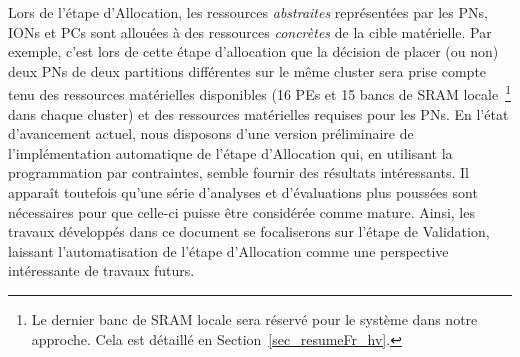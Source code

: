 \documentclass[main.tex]{subfiles}
\begin{document}
Lors de l'étape d'Allocation, les ressources \emph{abstraites} représentées par les PNs, IONs et PCs sont allouées à des ressources \emph{concrètes} de la cible matérielle. Par exemple, c'est lors de cette étape d'allocation que la décision de placer (ou non) deux PNs de deux partitions différentes sur le même cluster sera prise compte tenu des ressources matérielles disponibles (16 PEs et 15 bancs de SRAM locale~\footnote{Le dernier banc de SRAM locale sera réservé pour le système dans notre approche. Cela est détaillé en Section~\ref{sec_resumeFr_hv}.} dans chaque cluster) et des ressources matérielles requises pour les PNs. En l'état d'avancement actuel, nous disposons d'une version préliminaire de l'implémentation automatique de l'étape d'Allocation qui, en utilisant la programmation par contraintes, semble fournir des résultats intéressants. Il apparaît toutefois qu'une série d'analyses et d'évaluations plus poussées sont nécessaires pour que celle-ci puisse être considérée comme mature. Ainsi, les travaux développés dans ce document se focaliserons sur l'étape de Validation, laissant l'automatisation de l'étape d'Allocation comme une perspective intéressante de travaux futurs. 
\end{document}
